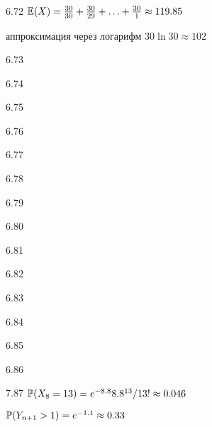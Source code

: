 \begin{solution}{{6.72}}
  $\E(X)=\frac{30}{30} + \frac{30}{29} + \ldots + \frac{30}{1}\approx 119.85$

  аппроксимация через логарифм $30 \ln 30 \approx 102$
\end{solution}
\protect \hypertarget {soln:6.73}{}
\begin{solution}{{6.73}}
\end{solution}
\protect \hypertarget {soln:6.74}{}
\begin{solution}{{6.74}}
\end{solution}
\protect \hypertarget {soln:6.75}{}
\begin{solution}{{6.75}}
\end{solution}
\protect \hypertarget {soln:6.76}{}
\begin{solution}{{6.76}}
\end{solution}
\protect \hypertarget {soln:6.77}{}
\begin{solution}{{6.77}}
\end{solution}
\protect \hypertarget {soln:6.78}{}
\begin{solution}{{6.78}}
\end{solution}
\protect \hypertarget {soln:6.79}{}
\begin{solution}{{6.79}}
\end{solution}
\protect \hypertarget {soln:6.80}{}
\begin{solution}{{6.80}}
\end{solution}
\protect \hypertarget {soln:6.81}{}
\begin{solution}{{6.81}}
\end{solution}
\protect \hypertarget {soln:6.82}{}
\begin{solution}{{6.82}}
\end{solution}
\protect \hypertarget {soln:6.83}{}
\begin{solution}{{6.83}}
\end{solution}
\protect \hypertarget {soln:6.84}{}
\begin{solution}{{6.84}}
\end{solution}
\protect \hypertarget {soln:6.85}{}
\begin{solution}{{6.85}}
\end{solution}
\protect \hypertarget {soln:6.86}{}
\begin{solution}{{6.86}}
\end{solution}
\protect \hypertarget {soln:7.87}{}
\begin{solution}{{7.87}}
  $\P(X_8=13)=e^{-8.8}8.8^{13}/13!\approx 0.046$

  $\P(Y_{n+1}>1)=e^{-1.1}\approx 0.33$
\end{solution}
